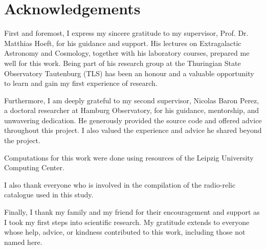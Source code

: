\section*{\centering Acknowledgements}
{}

\vspace{1cm}
First and foremost, I express my sincere gratitude to my supervisor, Prof. Dr. Matthias Hoeft, for his guidance and support.
His lectures on Extragalactic Astronomy and Cosmology, together with his laboratory courses, prepared me well for this work.
Being part of his research group at the Thuringian State Observatory Tautenburg (TLS) has been an honour and a valuable opportunity to learn and gain my first experience of research.

Furthermore, I am deeply grateful to my second supervisor, Nicolas Baron Perez, a doctoral researcher at Hamburg Observatory, for his guidance, mentorship, and unwavering dedication. He generously provided the source code and offered advice throughout this project. I also valued the experience and advice he shared beyond the project.

Computations for this work were done using resources of the Leipzig University Computing Center.

I also thank everyone who is involved in the compilation of the radio-relic catalogue used in this study.

Finally, I thank my family and my friend for their encouragement and support as I took my first steps into scientific research. My gratitude extends to everyone whose help, advice, or kindness contributed to this work, including those not named here.
